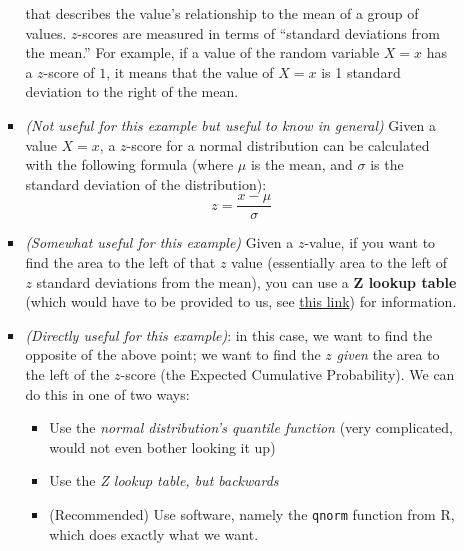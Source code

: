 \documentclass[12pt]{article}
\begin{document}
\begin{itemize}
\begin{enumerate}
\begin{itemize}
			                  that describes the value's relationship to the mean
			                  of a group of values. $z$-scores are
			                  measured in terms of ``standard deviations from the
			                  mean.'' For example, if a value of the random
			                  variable $X = x$ has a $z$-score of $1$, it means that
			                  the value of $X = x$ is 1 standard deviation to the
			                  right of the mean.
			            \item \emph{(Not useful for this example but useful to
				                  know in general)} Given a value $X = x$, a
			                  $z$-score for a normal distribution can be
			                  calculated with the following formula (where
			                  $\mu$ is the mean, and $\sigma$ is the standard
			                  deviation of the
			                  distribution):
			                  \[
				                  z = \frac{x - \mu}{\sigma}
			                  \]
			            \item \emph{(Somewhat useful for this example)} Given a $z$-value,
			                  if you want to find the area to the left of that
			                  $z$ value (essentially area to the left of $z$ standard
			                  deviations from the mean), you can use a
			                  \textbf{Z lookup table} (which would have to be
			                  provided to us, see
			                  \href{https://www.ztable.net/}{this link}) for
			                  information.
			            \item \emph{(Directly useful for this example)}: in this case,
			                  we want to find the opposite of the above point; we want to
			                  find the $z$ \emph{given} the area to the left of the $z$-score
			                  (the Expected Cumulative Probability). We can do this in one of
			                  two ways:
			                  \begin{itemize}
				                  \item Use the \emph{normal distribution's quantile function} (very complicated, would not even bother looking it up)
				                  \item Use the \emph{Z lookup table, but backwards}
				                  \item (Recommended) Use software, namely the \verb|qnorm| function from R, which does exactly what we want.
			                  \end{itemize}
		            \end{itemize}
	      \end{enumerate}
\end{itemize}
\end{document}
